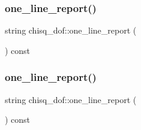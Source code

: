 \subsubsection{\texorpdfstring{one\_line\_report()}{one\_line\_report()}\hspace{0.1cm}{\footnotesize\ttfamily [1/2]}}
{\footnotesize\ttfamily string chisq\+\_\+dof\+::one\+\_\+line\+\_\+report (\begin{DoxyParamCaption}{ }\end{DoxyParamCaption}) const}

\mbox{\label{structchisq__dof_af82b1ce8f285c664b9c9529df2dc527a}} 
\subsubsection{\texorpdfstring{one\_line\_report()}{one\_line\_report()}\hspace{0.1cm}{\footnotesize\ttfamily [2/2]}}
{\footnotesize\ttfamily string chisq\+\_\+dof\+::one\+\_\+line\+\_\+report (\begin{DoxyParamCaption}{ }\end{DoxyParamCaption}) const}

